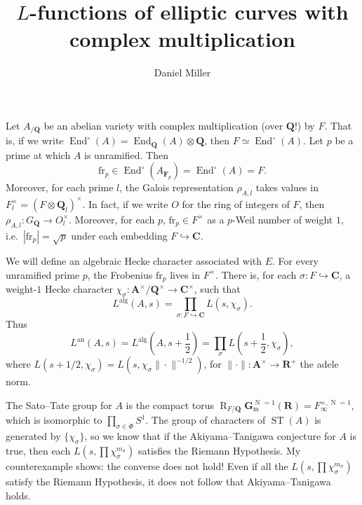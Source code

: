 \documentclass{article}
\title{$L$-functions of elliptic curves with complex multiplication}
\author{Daniel Miller}
\DeclareMathOperator{\End}{End}
\DeclareMathOperator{\N}{N}
\DeclareMathOperator{\res}{R}
\DeclareMathOperator{\ST}{ST}
\newcommand{\bA}{\mathbf{A}}
\newcommand{\bC}{\mathbf{C}}
\newcommand{\bF}{\mathbf{F}}
\newcommand{\Gm}{\mathbf{G}_\mathrm{m}}
\newcommand{\bQ}{\mathbf{Q}}
\newcommand{\bR}{\mathbf{R}}
\newcommand{\alg}{\mathrm{alg}}
\newcommand{\an}{\mathrm{an}}
\newcommand{\frob}{\mathrm{fr}}
\begin{document}
\maketitle





Let $A_{/\bQ}$ be an abelian variety with complex multiplication (over $\bQ$!) 
by $F$. That is, if we write $\End^\circ(A) = \End_\bQ(A)\otimes\bQ$, then 
$F\simeq \End^\circ(A)$. Let $p$ be a prime at which $A$ is unramified. Then 
\[
	\frob_p \in \End^\circ(A_{\bF_p}) = \End^\circ(A) = F .
\]
Moreover, for each prime $l$, the Galois representation $\rho_{A,l}$ takes 
values in $F_l^\times = (F\otimes \bQ_l)^\times$. In fact, if we write $O$ 
for the ring of integers of $F$, then 
$\rho_{A,l}\colon G_\bQ \to O_l^\times$. Moreover, for each $p$, 
$\frob_p\in F^\times$ as a $p$-Weil number of weight $1$, 
i.e.~$|\frob_p| = \sqrt p$ under each embedding $F\hookrightarrow \bC$. 

We will define an algebraic Hecke character associated with $E$. For 
every unramified prime $p$, the Frobenius $\frob_p$ lives in $F^\times$. 
There is, for each $\sigma\colon F \hookrightarrow \bC$, a weight-$1$ Hecke 
character $\chi_\sigma\colon \bA^\times/\bQ^\times \to \bC^\times$, such 
that 
\[
	L^\alg(A,s) = \prod_{\sigma\colon F\hookrightarrow \bC} L(s,\chi_\sigma) .
\]
Thus 
\[
	L^\an(A,s) = L^\alg\left(A,s+\frac 1 2\right) = \prod_\sigma L\left(s+\frac 1 2,\chi_\sigma\right) ,
\]
where $L(s+1/2,\chi_\sigma) = L(s, \chi_\sigma \|\cdot\|^{-1/2})$, for 
$\|\cdot\|\colon \bA^\times \to \bR^+$ the adele norm. 

The Sato--Tate group for $A$ is the compact torus 
$\res_{F/\bQ}\Gm^{\N = 1}(\bR) = F_\infty^{\times, \N=1}$, which is isomorphic 
to $\prod_{\sigma \in \Phi} S^1$. The group of characters of $\ST(A)$ is 
generated by $\{\chi_\sigma\}$, so we know that if the Akiyama--Tanigawa 
conjecture for $A$ is true, then each $L(s,\prod \chi_\sigma^{m_\sigma})$ 
satisfies the Riemann Hypothesis. My counterexample shows: the converse does 
not hold! Even if all the $L(s,\prod \chi_\sigma^{m_\sigma})$ satisfy the 
Riemann Hypothesis, it does not follow that Akiyama--Tanigawa holds. 
\end{document}
